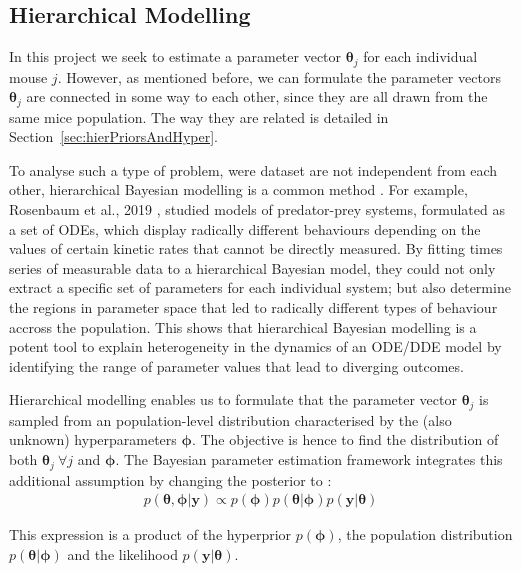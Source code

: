 \documentclass[11pt]{article}
\begin{document}
\subsection{Hierarchical Modelling}

In this project we seek to estimate a parameter vector $\boldsymbol{\theta}_j$ for each individual mouse $j$. However, as mentioned before, we can formulate the parameter vectors $\boldsymbol{\theta}_j$ are connected in some way to each other, since they are all drawn from the same mice population. The way they are related is detailed in Section~\ref{sec:hierPriorsAndHyper}.

To analyse such a type of problem, were dataset are not independent from each other, hierarchical Bayesian modelling is a common method \cite{revParamEst}\cite{rosenbaum}. For example, Rosenbaum et al., 2019 \cite{rosenbaum}, studied models of predator-prey systems, formulated as a set of ODEs, which display radically different behaviours depending on the values of certain kinetic rates that cannot be directly measured. By fitting times series of measurable data to a hierarchical Bayesian model, they could not only extract a specific set of parameters for each individual system; but also determine the regions in parameter space that led to radically different types of behaviour accross the population. This shows that hierarchical Bayesian modelling is a potent tool to explain heterogeneity in the dynamics of an ODE/DDE model by identifying the range of parameter values that lead to diverging outcomes. 

Hierarchical modelling enables us to formulate that the parameter vector $\boldsymbol{\theta}_j$ is sampled from an population-level distribution characterised by the (also unknown) hyperparameters $\boldsymbol{\phi}$. The objective is hence to find the distribution of both $\boldsymbol{\theta}_j~\forall j$ and $\boldsymbol{\phi}$. The Bayesian parameter estimation framework integrates this additional assumption by changing the posterior to \cite{tbk_gelman}:
\begin{align*}
    p(\boldsymbol{\theta}, \boldsymbol{\phi} | \boldsymbol{y}) \propto p(\boldsymbol{\phi})p(\boldsymbol{\theta}|\boldsymbol{\phi})p(\boldsymbol{y}|\boldsymbol{\theta})
\end{align*} 

This expression is a product of the hyperprior $p(\boldsymbol{\phi})$, the population distribution $p(\boldsymbol{\theta}|\boldsymbol{\phi})$ and the likelihood $p(\boldsymbol{y}|\boldsymbol{\theta})$.
\end{document}

